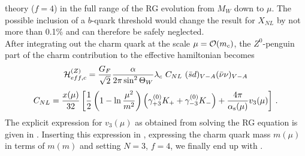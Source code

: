 theory ($f=4$) in the full range of the RG evolution from $M_W$ down to
$\mu$. The possible inclusion of a $b$-quark threshold would change the
result for $X_{NL}$ by not more than 0.1\% and can therefore be safely
neglected.\\ After integrating out the charm quark at the scale
$\mu={\cal O}(m_c)$, the $Z^0$-penguin part of the charm contribution to
the effective hamiltonian becomes
\begin{equation}\label{hzc} {\cal H}^{(Z)}_{eff,c}={G_F \over{\sqrt 2}}
  {\alpha\over 2\pi \sin^2\Theta_W} \lambda_c\ C_{NL}\
   (\bar sd)_{V-A}(\bar\nu\nu)_{V-A}  \end{equation}
\begin{equation}\label{cnl}
C_{NL}={x(\mu)\over 32}\left[{1\over 2}\left(1-\ln{\mu^2\over m^2}\right)
  \left(\gamma^{(0)}_{+3} K_++\gamma^{(0)}_{-3} K_-\right)+
  {4\pi\over\alpha_{\rm s}(\mu)}v_3(\mu)\right] \, .
\end{equation}
The explicit expression for $v_3(\mu)$ as obtained from solving the RG
equation is given in \cite{buchallaburas:94}. Inserting this
expression in , expressing the charm quark mass $m(\mu)$ in
terms of $m(m)$ and setting $N=3$, $f=4$, we finally end up with
\eqn{cnln}.

